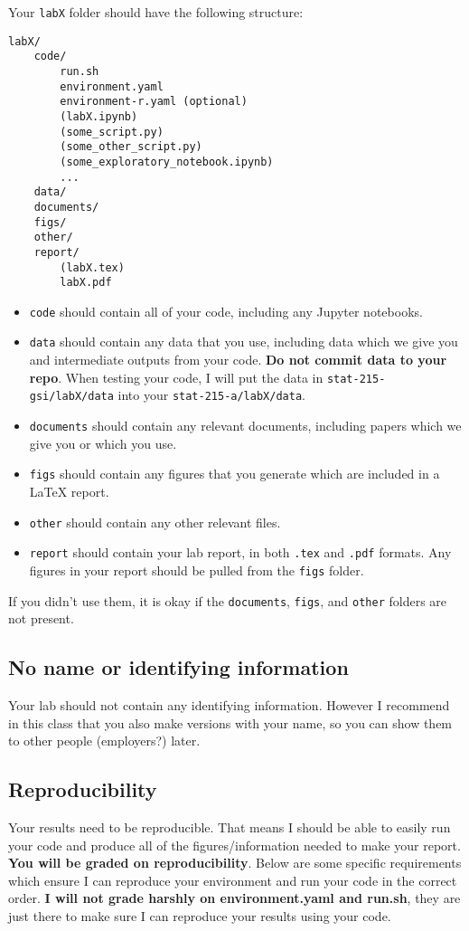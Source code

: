 \documentclass[letterpaper,12pt]{article}
\begin{document}
Your \texttt{labX} folder should have the following structure:
\begin{verbatim}
labX/
    code/
        run.sh
        environment.yaml
        environment-r.yaml (optional)
        (labX.ipynb)
        (some_script.py)
        (some_other_script.py)
        (some_exploratory_notebook.ipynb)
        ...
    data/
    documents/
    figs/
    other/
    report/
        (labX.tex)
        labX.pdf
\end{verbatim}
\begin{itemize}
    \item \texttt{code} should contain all of your code, including any Jupyter notebooks.
    \item  \texttt{data} should contain any data that you use, including data which we give you and intermediate outputs from your code. \textbf{Do not commit data to your repo}. When testing your code, I will put the data in \texttt{stat-215-gsi/labX/data} into your \texttt{stat-215-a/labX/data}.
    \item \texttt{documents} should contain any relevant documents, including papers which we give you or which you use.
    \item \texttt{figs} should contain any figures that you generate which are included in a LaTeX report.
    \item \texttt{other} should contain any other relevant files.
    \item \texttt{report} should contain your lab report, in both \texttt{.tex} and \texttt{.pdf} formats. Any figures in your report should be pulled from the \texttt{figs} folder.
\end{itemize}
If you didn't use them, it is okay if the \texttt{documents}, \texttt{figs}, and \texttt{other} folders are not present.

\subsection{No name or identifying information}
Your lab should not contain any identifying information. However I recommend in this class that you also make versions with your name, so you can show them to other people (employers?) later.

\subsection{Reproducibility}
Your results need to be reproducible. That means I should be able to easily run your code and produce all of the figures/information needed to make your report. \textbf{You will be graded on reproducibility}. Below are some specific requirements which ensure I can reproduce your environment and run your code in the correct order. \textbf{I will not grade harshly on environment.yaml and run.sh}, they are just there to make sure I can reproduce your results using your code.
\end{document}
